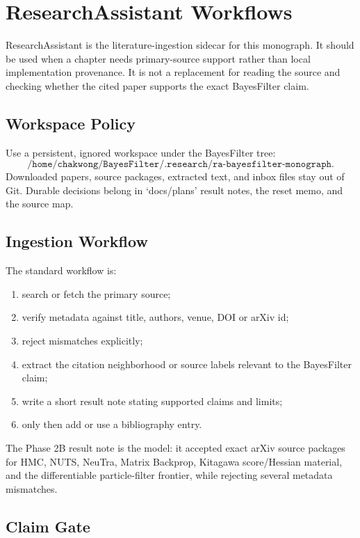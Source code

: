 \chapter{ResearchAssistant Workflows}
\label{app:bf-researchassistant-workflows}

ResearchAssistant is the literature-ingestion sidecar for this monograph.  It
should be used when a chapter needs primary-source support rather than local
implementation provenance.  It is not a replacement for reading the source and
checking whether the cited paper supports the exact BayesFilter claim.

\section{Workspace Policy}
\label{sec:bf-ra-workspace-policy}

Use a persistent, ignored workspace under the BayesFilter tree:
\[
  \texttt{/home/chakwong/BayesFilter/.research/ra-bayesfilter-monograph}.
\]
Downloaded papers, source packages, extracted text, and inbox files stay out of
Git.  Durable decisions belong in `docs/plans' result notes, the reset memo, and
the source map.

\section{Ingestion Workflow}
\label{sec:bf-ra-ingestion-workflow}

The standard workflow is:
\begin{enumerate}[label=(\roman*)]
  \item search or fetch the primary source;
  \item verify metadata against title, authors, venue, DOI or arXiv id;
  \item reject mismatches explicitly;
  \item extract the citation neighborhood or source labels relevant to the
    BayesFilter claim;
  \item write a short result note stating supported claims and limits;
  \item only then add or use a bibliography entry.
\end{enumerate}
The Phase 2B result note is the model: it accepted exact arXiv source packages
for HMC, NUTS, NeuTra, Matrix Backprop, Kitagawa score/Hessian material, and
the differentiable particle-filter frontier, while rejecting several metadata
mismatches.

\section{Claim Gate}
\label{sec:bf-ra-claim-gate}

